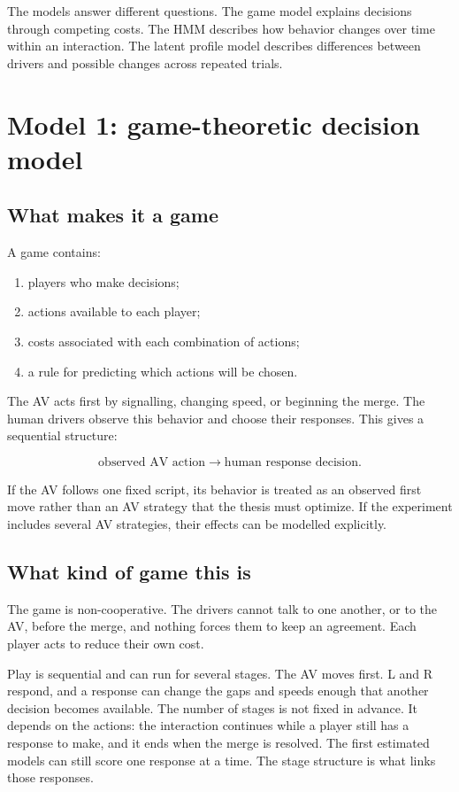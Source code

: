 \documentclass[11pt,a4paper]{article}
\begin{document}
The models answer different questions. The game model explains decisions through competing costs. The HMM describes how behavior changes over time within an interaction. The latent profile model describes differences between drivers and possible changes across repeated trials.

\section{Model 1: game-theoretic decision model}

\subsection{What makes it a game}

A game contains:

\begin{enumerate}[noitemsep]
  \item players who make decisions;
  \item actions available to each player;
  \item costs associated with each combination of actions;
  \item a rule for predicting which actions will be chosen.
\end{enumerate}

The AV acts first by signalling, changing speed, or beginning the merge. The human drivers observe this behavior and choose their responses. This gives a sequential structure:

\begin{equation}
\text{observed AV action}
\longrightarrow
\text{human response decision}.
\end{equation}

If the AV follows one fixed script, its behavior is treated as an observed first move rather than an AV strategy that the thesis must optimize. If the experiment includes several AV strategies, their effects can be modelled explicitly.

\subsection{What kind of game this is}

The game is non-cooperative. The drivers cannot talk to one another, or to the AV, before the merge, and nothing forces them to keep an agreement. Each player acts to reduce their own cost.

Play is sequential and can run for several stages. The AV moves first. L and R respond, and a response can change the gaps and speeds enough that another decision becomes available. The number of stages is not fixed in advance. It depends on the actions: the interaction continues while a player still has a response to make, and it ends when the merge is resolved. The first estimated models can still score one response at a time. The stage structure is what links those responses.
\end{document}
